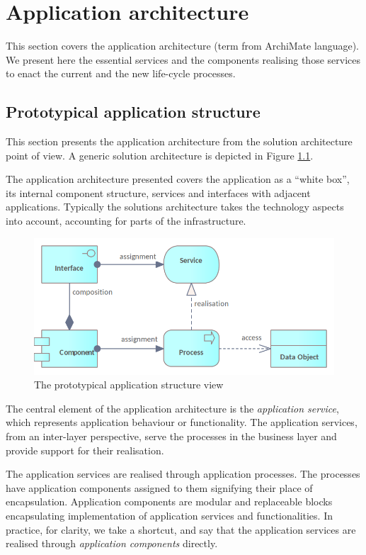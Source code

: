 \chapter{Application architecture}
\label{sec:application-architecture}

    This section covers the application architecture (term from ArchiMate language). We present here the essential services and the components realising those services to enact the current and the new life-cycle processes.

	\section{Prototypical application structure}
	
	This section presents the application architecture from the solution architecture point of view. A generic solution architecture is depicted in Figure \ref{fig:application-view}.
	
	The application architecture presented covers the application as a ``white box'', its internal component structure, services and interfaces with adjacent applications. Typically the solutions architecture takes the technology aspects into account, accounting for parts of the infrastructure.
	
    \begin{figure}[h]
		\centering
		\includegraphics[width=.6\textwidth]{images/views/Application view.png}
		\caption{The prototypical application structure view}
		\label{fig:application-view}
	\end{figure}

	The central element of the application architecture is the \textit{application service}, which represents application behaviour or functionality. The application services, from an inter-layer perspective, serve the processes in the business layer and provide support for their realisation. 
	
	The application services are realised through application processes. The processes have application components assigned to them signifying their place of encapsulation. Application components are modular and replaceable blocks encapsulating implementation of application services and functionalities. In practice, for clarity, we take a shortcut, and say that the application services are realised through \textit{application components} directly.
	

